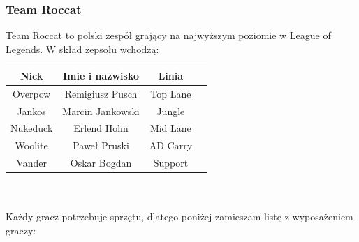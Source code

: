 \documentclass{article}
\begin{document}
\subsubsection{Team Roccat}
Team Roccat to polski zespół grający na najwyższym poziomie w League of Legends. W skład zepsołu wchodzą:\\
\label{Tabela 2}
\begin{tabular}{|c|c|c|c|} \hline
Nick & Imie i nazwisko & Linia\\
\hline
Overpow & Remigiusz Pusch & Top Lane\\
\hline
Jankos & Marcin Jankowski & Jungle\\
\hline
Nukeduck & Erlend Holm & Mid Lane\\
\hline
Woolite & Paweł Pruski & AD Carry \\
\hline
Vander & Oskar Bogdan & Support\\
\hline
\end{tabular}\\ \\
Każdy gracz potrzebuje sprzętu, dlatego poniżej zamieszam listę z wyposażeniem graczy:
\end{document}
